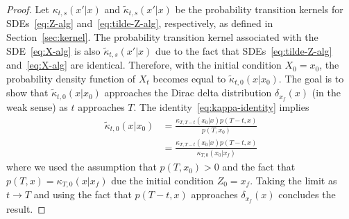 \documentclass[letterpaper, 10 pt, conference]{ieeeconf}  %
\begin{document}
\begin{proof}
Let $\kappa_{t,s}(x'|x)$ and $\tilde \kappa_{t,s}(x'|x)$ be the probability transition kernels for SDEs~\eqref{eq:Z-alg} and~\eqref{eq:tilde-Z-alg}, respectively, as defined in Section~\ref{sec:kernel}.  
The probability transition kernel associated with the SDE~\eqref{eq:X-alg} is also $\tilde \kappa_{t,s}(x'|x)$ due to the fact that SDEs~\eqref{eq:tilde-Z-alg} and~\eqref{eq:X-alg} are identical.  Therefore, with the initial condition $X_0=x_0$, the probability density function of $X_t$ becomes equal to $\tilde \kappa_{t,0}(x|x_0)$. The goal is to show that  $\tilde \kappa_{t,0}(x|x_0)$ approaches the Dirac delta distribution $\delta_{x_f}(x)$ (in the weak sense) as $t$ approaches $T$. The identity~\eqref{eq:kappa-identity} implies  
    \begin{align*}
   \tilde \kappa_{t,0}(x|x_0)  &= \frac{  \kappa_{T,T-t}(x
    _0|x)p(T-t,x)}{ p(T,x_0)}\\
    &=\frac{  \kappa_{T,T-t}(x
    _0|x)p(T-t,x)}{ \kappa_{T,0}(x_0|x_f)}
\end{align*}
where we used the assumption that $p(T,x_0)>0$ and the fact that $ p(T,x)= \kappa_{T,0}(x|x_f)$ due the initial condition $Z_0=x_f$. 
 Taking the limit as $t\to T$ and using the fact that $p(T-t,x)$ approaches $\delta_{x_f}(x)$ concludes the result. 
\end{proof}
\end{document}

